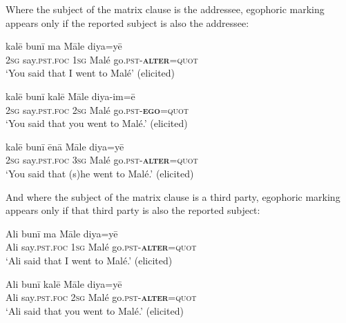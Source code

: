 \documentclass[output=paper]{langsci/langscibook}
\begin{document}
 Where the subject of the matrix clause is the addressee, egophoric marking appears only if the reported subject is also the addressee:
 
 
\begin{exe}
	\ex 	\label{ex:jl18}
	\gll kalē bunī ma Māle diya=yē\\
	2\textsc{sg} say.\textsc{pst}.\textsc{foc} 1\textsc{sg} Malé go.\textsc{pst}-\textbf{\textsc{alter}}=\textsc{quot}\\
	\trans ‘You said that I went to Malé’ (elicited)
\end{exe}

\begin{exe}
	\ex 	\label{ex:jl19}
	\gll kalē bunī kalē Māle diya-im=ē\\
	2\textsc{sg} say.\textsc{pst}.\textsc{foc} 2\textsc{sg} Malé go.\textsc{pst}-\textbf{\textsc{ego}}=\textsc{quot}\\
	\trans ‘You said that you went to Malé.’ (elicited)
\end{exe}

\begin{exe}
	\ex 	\label{ex:jl20}
	\gll kalē bunī ēnā Māle diya=yē\\
	2\textsc{sg} say.\textsc{pst}.\textsc{foc} 3\textsc{sg} Malé go.\textsc{pst}-\textbf{\textsc{alter}}=\textsc{quot}\\
	\trans ‘You said that (s)he went to Malé.’ (elicited)
\end{exe}

And where the subject of the matrix clause is a third party, egophoric marking appears only if that third party is also the reported subject:

\begin{exe}
	\ex 	\label{ex:jl21}
	\gll Ali bunī ma Māle diya=yē\\
	Ali say.\textsc{pst}.\textsc{foc} 1\textsc{sg} Malé go.\textsc{pst}-\textbf{\textsc{alter}}=\textsc{quot}\\
	\trans ‘Ali said that I went to Malé.’ (elicited)
\end{exe}

\begin{exe}
	\ex 	\label{ex:jl22}
	\gll Ali bunī kalē Māle diya=yē\\
	Ali say.\textsc{pst}.\textsc{foc} 2\textsc{sg} Malé go.\textsc{pst}-\textbf{\textsc{alter}}=\textsc{quot}\\
	\trans ‘Ali said that you went to Malé.’ (elicited)
\end{exe}
\end{document}
